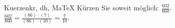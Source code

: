 \begin{MAufgabe}{Kuerzen}{kr, dh, MaTeX}
K\"urzen Sie soweit m\"oglich: $\frac{602}{860}$.\\ 
\ifLsg\MLoesung
\quad $\frac{602}{860}=\frac{(86)\cdot(7)}{(86)\cdot(10)}=\frac{7}{10}$.\else\relax\fi
 \end{MAufgabe}